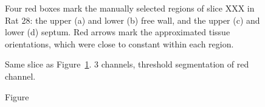 \begin{figure}[htbp]
  \centering
  \caption{Four red boxes mark the manually selected regions of slice XXX in Rat 28: the upper (a) and lower (b) free wall, and the upper (c) and lower (d) septum. Red arrows mark the approximated tissue orientations, which were close to constant within each region.}
  \label{fig:four_regions}
\end{figure}

\begin{figure}[htbp]
  \centering
  \caption{Same slice as Figure~\ref{fig:four_regions}. 3 channels, threshold segmentation of red channel.}
  \label{fig:channels}
\end{figure}

\begin{figure}[htbp]
  \centering
  \caption{Figure}
  \label{fig:closed_opened}
\end{figure}




